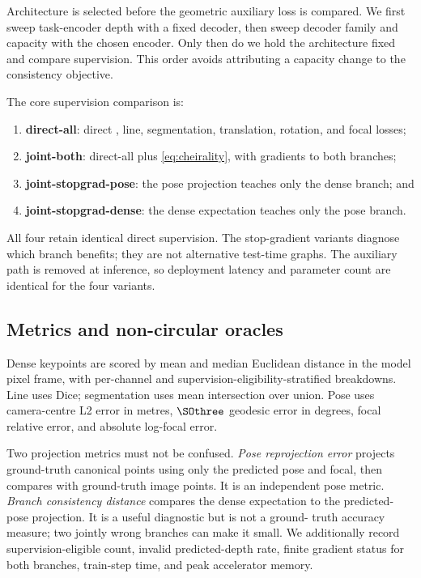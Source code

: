 Architecture is selected before the geometric auxiliary loss is compared.  We
first sweep task-encoder depth with a fixed decoder, then sweep decoder family
and capacity with the chosen encoder.  Only then do we hold the architecture
fixed and compare supervision.  This order avoids attributing a capacity change
to the consistency objective.



The core supervision comparison is:
\begin{enumerate}
  \item \textbf{direct-all}: direct \KP, line, segmentation, translation,
    rotation, and focal losses;
  \item \textbf{joint-both}: direct-all plus \cref{eq:cheirality}, with
    gradients to both branches;
  \item \textbf{joint-stopgrad-pose}: the pose projection teaches only the
    dense branch; and
  \item \textbf{joint-stopgrad-dense}: the dense expectation teaches only the
    pose branch.
\end{enumerate}
All four retain identical direct supervision.  The stop-gradient variants
diagnose which branch benefits; they are not alternative test-time graphs.
The auxiliary path is removed at inference, so deployment latency and parameter
count are identical for the four variants.

\subsection{Metrics and non-circular oracles}

Dense keypoints are scored by mean and median Euclidean distance in the model
pixel frame, with per-channel and supervision-eligibility-stratified breakdowns.  Line uses
Dice; segmentation uses mean intersection over union.  Pose uses camera-centre
L2 error in metres, \(\SOthree\) geodesic error in degrees, focal relative
error, and absolute log-focal error.

Two projection metrics must not be confused.  \emph{Pose reprojection error}
projects ground-truth canonical points using only the predicted pose and focal,
then compares with ground-truth image points.  It is an independent pose
metric.  \emph{Branch consistency distance} compares the dense expectation to
the predicted-pose projection.  It is a useful diagnostic but is not a ground-
truth accuracy measure; two jointly wrong branches can make it small.
We additionally record supervision-eligible count, invalid predicted-depth rate, finite
gradient status for both branches, train-step time, and peak accelerator memory.

